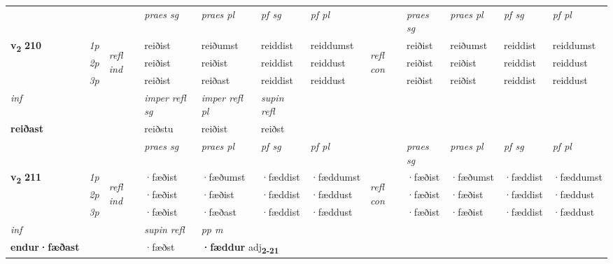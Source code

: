 \begin{longtable}[l]{X>{\footnotesize\itshape}llXXXXlXXXX}
 & &   & \textit{praes sg}  & \textit{praes pl}    & \textit{ pf sg} & \textit{pf pl} & & \textit{praes sg}  & \textit{praes pl}    & \textit{pf sg} & \textit{pf pl }  \\ \cmidrule{4-7} \cmidrule{9-12}
 \multirow{2}{*}{{{\textbf{v{\textsubscript{2}}} \Large{\textbf{210}}}}}  & 1p & \multirow{3}{*}{\begin{turn}{90}\textit{refl ind}\end{turn}}  & reiðist & reiðumst & reiddist & reiddumst & \multirow{3}{*}{\begin{turn}{90}\textit{refl con}\end{turn}}  &reiðist & reiðumst & reiddist & reiddumst \\*
 & 2p &  & reiðist & reiðist & reiddist & reiddust & &reiðist & reiðist & reiddist & reiddust \\*
 & 3p  & & reiðist & reiðast & reiddist & reiddust & & reiðist & reiðist& reiddist & reiddust \\*
\cmidrule{4-7} \cmidrule{9-12}

   {\textit{inf}} & &   & \textit{imper refl sg} & \textit{imper refl pl}   & \textit{supin refl}  \\*
  {\textbf{reiðast}} & &   & reiðstu & reiðist   & reiðst  \\*

\midrule

 & &   & \textit{praes sg}  & \textit{praes pl}    & \textit{ pf sg} & \textit{pf pl} & & \textit{praes sg}  & \textit{praes pl}    & \textit{pf sg} & \textit{pf pl }  \\ \cmidrule{4-7} \cmidrule{9-12}
 \multirow{2}{*}{{{\textbf{v{\textsubscript{2}}} \Large{\textbf{211}}}}}  & 1p & \multirow{3}{*}{\begin{turn}{90}\textit{refl ind}\end{turn}}  & ·fæðist & ·fæðumst & ·fæddist & ·fæddumst & \multirow{3}{*}{\begin{turn}{90}\textit{refl con}\end{turn}}  &·fæðist & ·fæðumst & ·fæddist & ·fæddumst \\*
 & 2p &  & ·fæðist & ·fæðist & ·fæddist & ·fæddust & &·fæðist & ·fæðist & ·fæddist & ·fæddust \\*
 & 3p  & & ·fæðist & ·fæðast & ·fæddist & ·fæddust & & ·fæðist & ·fæðist& ·fæddist & ·fæddust \\*
\cmidrule{4-7} \cmidrule{9-12}

   {\textit{inf}} & &       & \textit{supin refl} & \textit{pp m} \\*
  {\textbf{endur\allowbreak ·fæðast}} & &       & ·fæðst & \multicolumn{2}{l}{\textbf{·fæddur} adj\textbf{\textsubscript{2-21}}} \\*


\end{longtable}
